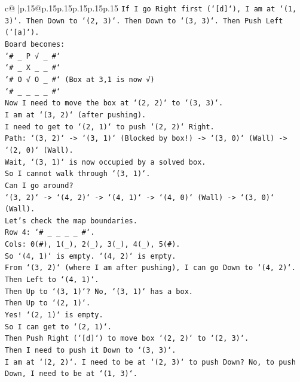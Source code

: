 \documentclass{article}
\begin{document}
{\begin{supertabular}{c@{$\;$}|p{.15\linewidth}@{}p{.15\linewidth}p{.15\linewidth}p{.15\linewidth}p{.15\linewidth}p{.15\linewidth}}
{{{\texttt{If I go Right first (`{[}d{]}`), I am at `(1, 3)`. Then Down to `(2, 3)`. Then Down to `(3, 3)`. Then Push Left (`{[}a{]}`).} \\
\texttt{Board becomes:} \\
\texttt{`\# \_ P √ \_ \#`} \\
\texttt{`\# \_ X \_ \_ \#`} \\
\texttt{`\# O √ O \_ \#` (Box at 3,1 is now √)} \\
\texttt{`\# \_ \_ \_ \_ \#`} \\
\texttt{Now I need to move the box at `(2, 2)` to `(3, 3)`.} \\
\texttt{I am at `(3, 2)` (after pushing).} \\
\texttt{I need to get to `(2, 1)` to push `(2, 2)` Right.} \\
\texttt{Path: `(3, 2)` {-}> `(3, 1)` (Blocked by box!) {-}> `(3, 0)` (Wall) {-}> `(2, 0)` (Wall).} \\
\texttt{Wait, `(3, 1)` is now occupied by a solved box.} \\
\texttt{So I cannot walk through `(3, 1)`.} \\
\texttt{Can I go around?} \\
\texttt{`(3, 2)` {-}> `(4, 2)` {-}> `(4, 1)` {-}> `(4, 0)` (Wall) {-}> `(3, 0)` (Wall).} \\
\texttt{Let's check the map boundaries.} \\
\texttt{Row 4: `\# \_ \_ \_ \_ \#`.} \\
\texttt{Cols: 0(\#), 1(\_), 2(\_), 3(\_), 4(\_), 5(\#).} \\
\texttt{So `(4, 1)` is empty. `(4, 2)` is empty.} \\
\texttt{From `(3, 2)` (where I am after pushing), I can go Down to `(4, 2)`.} \\
\texttt{Then Left to `(4, 1)`.} \\
\texttt{Then Up to `(3, 1)`? No, `(3, 1)` has a box.} \\
\texttt{Then Up to `(2, 1)`.} \\
\texttt{Yes! `(2, 1)` is empty.} \\
\texttt{So I can get to `(2, 1)`.} \\
\texttt{Then Push Right (`{[}d{]}`) to move box `(2, 2)` to `(2, 3)`.} \\
\texttt{Then I need to push it Down to `(3, 3)`.} \\
\texttt{I am at `(2, 2)`. I need to be at `(2, 3)` to push Down? No, to push Down, I need to be at `(1, 3)`.} \\
}}}
\end{supertabular}}
\end{document}
